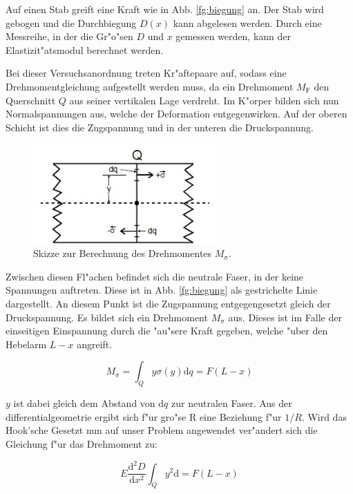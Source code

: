 		Auf einen Stab greift eine Kraft wie in Abb. \ref{fg:biegung} an. Der Stab wird gebogen und die Durchbiegung $D(x)$ kann abgelesen werden. Durch eine Messreihe, in der die Gr"o"sen $D$ und $x$ gemessen werden, kann der Elastizit"atsmodul berechnet werden.

		Bei dieser Versuchsanordnung treten Kr"aftepaare auf, sodass eine Drehmomentgleichung aufgestellt werden muss, da ein Drehmoment $M_\mathrm{F}$ den Querschnitt $Q$ aus seiner vertikalen Lage verdreht. Im K"orper bilden sich nun Normalspannungen aus, welche der Deformation entgegenwirken. Auf der oberen Schicht ist dies die Zugspannung und in der unteren die Druckspannung. 

		\begin{figure}
			\centering
			\includegraphics[width = 7cm]{img/berechnung.JPG}
			\caption{Skizze zur Berechnung des Drehmomentes $M_\mathrm{\sigma}$.\cite{anleitung}}
			\label{fg:berechnung}
		\end{figure}

		Zwischen diesen Fl"achen befindet sich die neutrale Faser, in der keine Spannungen auftreten. Diese ist in Abb. \ref{fg:biegung} als gestrichelte Linie dargestellt. An diesem Punkt ist die Zugspannung entgegengesetzt gleich der Druckspannung. Es bildet sich ein Drehmoment $M_\mathrm{\sigma}$ aus.
		Dieses ist im Falle der einseitigen Einspannung durch die "au"sere Kraft gegeben, welche "uber den Hebelarm $L-x$ angreift.

		\begin{equation}
			M_\mathrm{\sigma} = \int_Q y \sigma(y)\mathrm{d}q = F(L-x)
		\end{equation}

		$y$ ist dabei gleich dem Abstand von $\mathrm{d}q$ zur neutralen Faser. Aus der differentialgeometrie ergibt sich f"ur gro"se R eine Beziehung f"ur $1/R$. Wird das Hook'sche Gesetzt nun auf unser Problem angewendet ver"andert sich die Gleichung f"ur das Drehmoment zu:

		\begin{equation}
			E \frac{\mathrm{d}^2D}{\mathrm{d}x^2} \int_Q y^2 \mathrm{d} = F (L-x)
		\end{equation}

